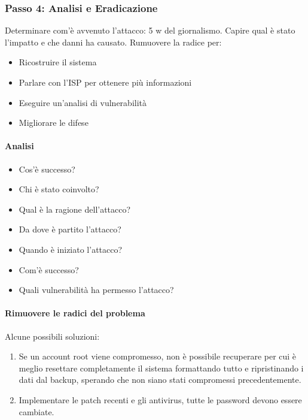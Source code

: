 \subsubsection{Passo 4: Analisi e Eradicazione}

Determinare com'è avvenuto l'attacco: 5 w del giornalismo. Capire qual è stato
l'impatto e che danni ha causato. Rumuovere la radice per:

\begin{itemize}
\item Ricostruire il sistema
\item Parlare con l'ISP per ottenere più informazioni
\item Eseguire un'analisi di vulnerabilità
\item Migliorare le difese 
\end{itemize}


\paragraph*{Analisi}

\begin{itemize}
\item Cos'è successo?
\item Chi è stato coinvolto?
\item Qual è la ragione dell'attacco?
\item Da dove è partito l'attacco?
\item Quando è iniziato l'attacco?
\item Com'è successo?
\item Quali vulnerabilità ha permesso l'attacco?
\end{itemize}


\paragraph*{Rimuovere le radici del problema}

Alcune possibili soluzioni:
\begin{enumerate}
\item Se un account root viene compromesso, non è possibile recuperare per cui è
meglio resettare completamente il sistema formattando tutto e ripristinando i
dati dal backup, sperando che non siano stati compromessi precedentemente.
\item Implementare le patch recenti e gli antivirus, tutte le password devono
essere cambiate.
\end{enumerate}

